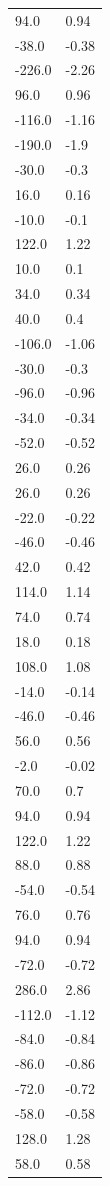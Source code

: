 \begin{longtable}{ll}
94.0 & 0.94 \\
-38.0 & -0.38 \\
-226.0 & -2.26 \\
96.0 & 0.96 \\
-116.0 & -1.16 \\
-190.0 & -1.9 \\
-30.0 & -0.3 \\
16.0 & 0.16 \\
-10.0 & -0.1 \\
122.0 & 1.22 \\
10.0 & 0.1 \\
34.0 & 0.34 \\
40.0 & 0.4 \\
-106.0 & -1.06 \\
-30.0 & -0.3 \\
-96.0 & -0.96 \\
-34.0 & -0.34 \\
-52.0 & -0.52 \\
26.0 & 0.26 \\
26.0 & 0.26 \\
-22.0 & -0.22 \\
-46.0 & -0.46 \\
42.0 & 0.42 \\
114.0 & 1.14 \\
74.0 & 0.74 \\
18.0 & 0.18 \\
108.0 & 1.08 \\
-14.0 & -0.14 \\
-46.0 & -0.46 \\
56.0 & 0.56 \\
-2.0 & -0.02 \\
70.0 & 0.7 \\
94.0 & 0.94 \\
122.0 & 1.22 \\
88.0 & 0.88 \\
-54.0 & -0.54 \\
76.0 & 0.76 \\
94.0 & 0.94 \\
-72.0 & -0.72 \\
286.0 & 2.86 \\
-112.0 & -1.12 \\
-84.0 & -0.84 \\
-86.0 & -0.86 \\
-72.0 & -0.72 \\
-58.0 & -0.58 \\
128.0 & 1.28 \\
58.0 & 0.58 \\

\end{longtable}
